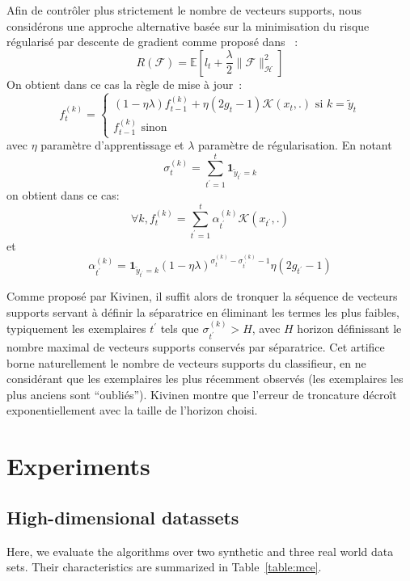 \documentclass[preprint,12pt,authoryear]{elsarticle}
\begin{document}
Afin de contrôler plus strictement le nombre de vecteurs supports, nous considérons une approche alternative basée sur la minimisation du risque régularisé par descente de gradient comme proposé dans \cite{kivinen2004online}~:
$$R(\mathcal{F}) = \mathbb{E}\left[ l_t + \frac{\lambda}{2}\|\mathcal{F}\|^2_\mathcal{H}\right]$$
On obtient dans ce cas la règle de mise à jour~:
$$f_t^{(k)}=\left\{
\begin{array}{l}
(1-\eta\lambda) f_{t-1}^{(k)} + \eta (2g_t-1) \mathcal{K}(x_t,.) \text{ si } k=\tilde{y}_t\\
f_{t-1}^{(k)} \text{ sinon}
\end{array}
\right.
$$
avec $\eta$ paramètre d'apprentissage et $\lambda$ paramètre de régularisation. En notant 
$$\sigma_t^{(k)} = \sum_{t^\prime=1}^t
\mathbf{1}_{\tilde{y}_{t^\prime}=k}$$
on obtient dans ce cas:
$$\forall k, f^{(k)}_t = \sum_{t^\prime = 1} ^t \alpha_{t^\prime}^{(k)} \mathcal{K}(x_{t^\prime},.)$$
et
$$\alpha_{t^\prime}^{(k)} = \mathbf{1}_{\tilde{y}_{t^\prime}=k}(1 - \eta \lambda)^{\sigma_t^{(k)} - \sigma_{t^\prime}^{(k)}-1}  \eta (2g_{t^\prime}-1)$$

Comme proposé par Kivinen, il suffit alors de tronquer la séquence de vecteurs supports servant à définir la séparatrice en éliminant les termes les plus faibles, typiquement les exemplaires $t^\prime$ tels que $\sigma_{t^\prime}^{(k)} > H$, avec $H$ horizon définissant le nombre maximal de vecteurs supports conservés par séparatrice. Cet artifice borne naturellement le nombre de vecteurs supports du classifieur, en ne considérant que les exemplaires les plus récemment observés (les exemplaires les plus anciens sont ``oubliés'').  Kivinen montre que l'erreur de troncature décroît exponentiellement avec la taille de l'horizon choisi. 





\section{Experiments}

\subsection{High-dimensional datassets}
\label{subsec:BPAE}
Here, we evaluate the algorithms over two synthetic and three real world data sets. Their characteristics are summarized in Table~\ref{table:mce}.
\end{document}
